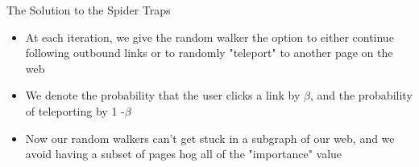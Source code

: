 \documentclass{beamer}
\begin{document}
\begin{frame}[t]{The Solution to the Spider Traps}
    \begin{itemize}
        \item At each iteration, we give the random walker the option to either continue following outbound links or to randomly "teleport" to another page on the web
        \item We denote the probability that the user clicks a link by $\beta$, and the probability of teleporting by 1 -$\beta$
        \item Now our random walkers can't get stuck in a subgraph of our web, and we avoid having a subset of pages hog all of the "importance" value
    \end{itemize}
\end{frame}
    
\end{document}
